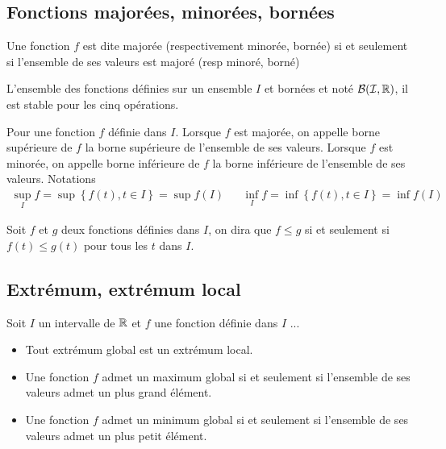 \subsection{Fonctions majorées, minorées, bornées}
\begin{defi}
 Une fonction $f$ est dite majorée (respectivement minorée, bornée) si et seulement si l'ensemble de ses valeurs est majoré (resp minoré, borné)
\end{defi}

L'ensemble des fonctions définies sur un ensemble $I$ et bornées et noté $\mathcal{B(I,\mathbb{R})}$, il est stable pour les cinq opérations.
\begin{defi}
 Pour une fonction $f$ définie dans $I$.\newline
Lorsque $f$ est majorée, on appelle  borne supérieure de $f$ la borne supérieure de l'ensemble de ses valeurs. Lorsque $f$ est minorée, on appelle  borne inférieure de $f$ la borne inférieure de l'ensemble de ses valeurs. Notations
\begin{align*}
 \sup_I f = \sup \left\lbrace f(t), t\in I\right\rbrace = \sup f(I)
& &
  \inf_I f = \inf \left\lbrace f(t), t\in I\right\rbrace = \inf f(I)
\end{align*}
\end{defi}
\begin{defi}
 Soit $f$ et $g$ deux fonctions définies dans $I$, on dira que $f\leq g$ si et seulement si $f(t)\leq g(t)$ pour tous les $t$ dans $I$.
\end{defi}
 

\subsection{Extrémum, extrémum local}
\begin{defi}
 Soit $I$ un intervalle de $\mathbb{R}$ et $f$ une fonction définie dans $I$ ...
\end{defi}
\begin{rems}
 \begin{itemize}
  \item Tout extrémum global est un extrémum local.
  \item Une fonction $f$ admet un maximum global si et seulement si l'ensemble de ses valeurs admet un plus grand élément.
  \item Une fonction $f$ admet un minimum global si et seulement si l'ensemble de ses valeurs admet un plus petit élément.
 \end{itemize}

\end{rems}

